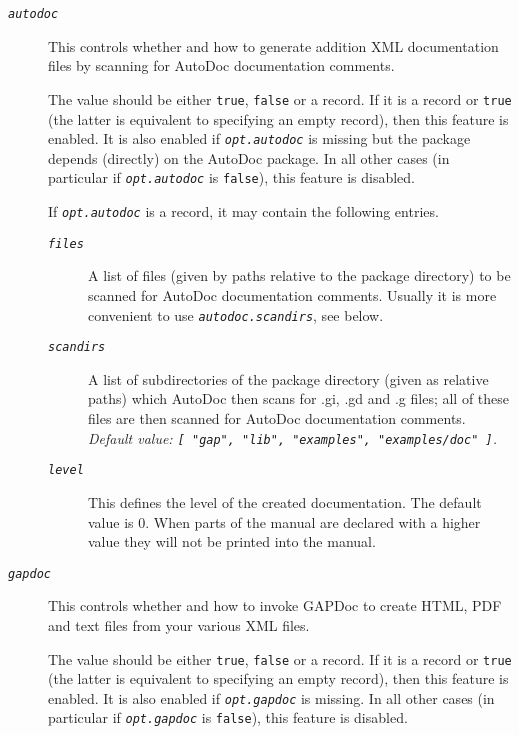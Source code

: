 \documentclass[a4paper,11pt]{report}
\begin{document}
{{{\begin{description}
\begin{description}
\item[{\mbox{\texttt{\mdseries\slshape autodoc}}}]  This controls whether and how to generate addition XML documentation files by
scanning for \textsf{AutoDoc} documentation comments. 

 The value should be either \texttt{true}, \texttt{false} or a record. If it is a record or \texttt{true} (the latter is equivalent to specifying an empty record), then this feature is
enabled. It is also enabled if \mbox{\texttt{\mdseries\slshape opt.autodoc}} is missing but the package depends (directly) on the \textsf{AutoDoc} package. In all other cases (in particular if \mbox{\texttt{\mdseries\slshape opt.autodoc}} is \texttt{false}), this feature is disabled. 

 If \mbox{\texttt{\mdseries\slshape opt.autodoc}} is a record, it may contain the following entries. 
\begin{description}
\item[{\mbox{\texttt{\mdseries\slshape files}}}]  A list of files (given by paths relative to the package directory) to be
scanned for \textsf{AutoDoc} documentation comments. Usually it is more convenient to use \mbox{\texttt{\mdseries\slshape autodoc.scan{\textunderscore}dirs}}, see below. 
\item[{\mbox{\texttt{\mdseries\slshape scan{\textunderscore}dirs}}}]  A list of subdirectories of the package directory (given as relative paths)
which \textsf{AutoDoc} then scans for .gi, .gd and .g files; all of these files are then scanned for \textsf{AutoDoc} documentation comments. \\
 \emph{Default value: \texttt{[ "gap", "lib", "examples", "examples/doc" ]}.} 
\item[{\mbox{\texttt{\mdseries\slshape level}}}]  This defines the level of the created documentation. The default value is 0.
When parts of the manual are declared with a higher value they will not be
printed into the manual. 
\end{description}
 
\item[{\mbox{\texttt{\mdseries\slshape gapdoc}}}]  This controls whether and how to invoke \textsf{GAPDoc} to create HTML, PDF and text files from your various XML files. 

 The value should be either \texttt{true}, \texttt{false} or a record. If it is a record or \texttt{true} (the latter is equivalent to specifying an empty record), then this feature is
enabled. It is also enabled if \mbox{\texttt{\mdseries\slshape opt.gapdoc}} is missing. In all other cases (in particular if \mbox{\texttt{\mdseries\slshape opt.gapdoc}} is \texttt{false}), this feature is disabled. 


\end{description}
\end{description}}}}
\end{document}
